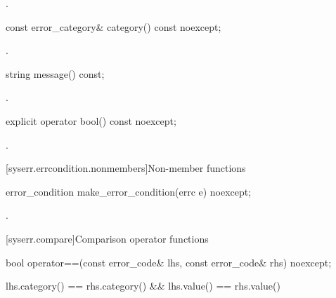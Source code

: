 \begin{itemdescr}
\pnum
\returns
{}.
\end{itemdescr}

%
\begin{itemdecl}
const error_category& category() const noexcept;
\end{itemdecl}

\begin{itemdescr}
\pnum
\returns
{}.
\end{itemdescr}

%
\begin{itemdecl}
string message() const;
\end{itemdecl}

\begin{itemdescr}
\pnum
\returns
{}.
\end{itemdescr}

%
\begin{itemdecl}
explicit operator bool() const noexcept;
\end{itemdecl}

\begin{itemdescr}
\pnum
\returns
{}.
\end{itemdescr}

[syserr.errcondition.nonmembers]{Non-member functions}

%
\begin{itemdecl}
error_condition make_error_condition(errc e) noexcept;
\end{itemdecl}

\begin{itemdescr}
\pnum
\returns
{}.
\end{itemdescr}

[syserr.compare]{Comparison operator functions}

%
\begin{itemdecl}
bool operator==(const error_code& lhs, const error_code& rhs) noexcept;
\end{itemdecl}

\begin{itemdescr}
\pnum
\returns
\begin{codeblock}
lhs.category() == rhs.category() && lhs.value() == rhs.value()
\end{codeblock}
\end{itemdescr}

